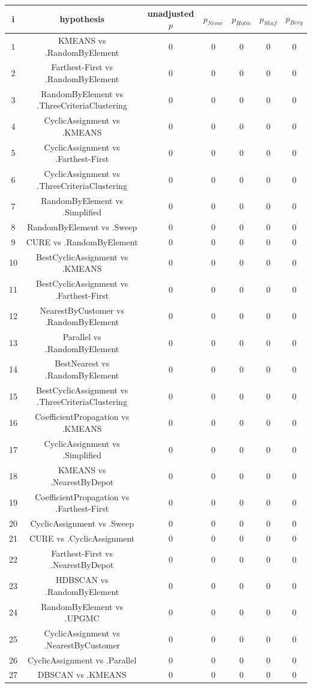 \documentclass[a4paper,10pt]{article}
\begin{document}
\begin{landscape}
\begin{table}[!htp]
\centering\scriptsize
\begin{tabular}{ccccccc}
i&hypothesis&unadjusted $p$&$p_{Neme}$&$p_{Holm}$&$p_{Shaf}$&$p_{Berg}$\\
\hline1&KMEANS vs .RandomByElement&0&0&0&0&0\\
2&Farthest-First vs .RandomByElement&0&0&0&0&0\\
3&RandomByElement vs .ThreeCriteriaClustering&0&0&0&0&0\\
4&CyclicAssignment vs .KMEANS&0&0&0&0&0\\
5&CyclicAssignment vs .Farthest-First&0&0&0&0&0\\
6&CyclicAssignment vs .ThreeCriteriaClustering&0&0&0&0&0\\
7&RandomByElement vs .Simplified&0&0&0&0&0\\
8&RandomByElement vs .Sweep&0&0&0&0&0\\
9&CURE vs .RandomByElement&0&0&0&0&0\\
10&BestCyclicAssignment vs .KMEANS&0&0&0&0&0\\
11&BestCyclicAssignment vs .Farthest-First&0&0&0&0&0\\
12&NearestByCustomer vs .RandomByElement&0&0&0&0&0\\
13&Parallel vs .RandomByElement&0&0&0&0&0\\
14&BestNearest vs .RandomByElement&0&0&0&0&0\\
15&BestCyclicAssignment vs .ThreeCriteriaClustering&0&0&0&0&0\\
16&CoefficientPropagation vs .KMEANS&0&0&0&0&0\\
17&CyclicAssignment vs .Simplified&0&0&0&0&0\\
18&KMEANS vs .NearestByDepot&0&0&0&0&0\\
19&CoefficientPropagation vs .Farthest-First&0&0&0&0&0\\
20&CyclicAssignment vs .Sweep&0&0&0&0&0\\
21&CURE vs .CyclicAssignment&0&0&0&0&0\\
22&Farthest-First vs .NearestByDepot&0&0&0&0&0\\
23&HDBSCAN vs .RandomByElement&0&0&0&0&0\\
24&RandomByElement vs .UPGMC&0&0&0&0&0\\
25&CyclicAssignment vs .NearestByCustomer&0&0&0&0&0\\
26&CyclicAssignment vs .Parallel&0&0&0&0&0\\
27&DBSCAN vs .KMEANS&0&0&0&0&0\\

\end{tabular}
\end{table}
\end{landscape}
\end{document}

